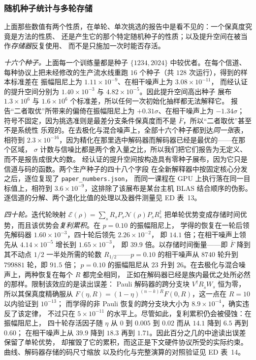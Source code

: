 \documentclass[11pt,a4paper]{article}
\begin{document}
\subsubsection*{随机种子统计与多轮存储}

上面那些数值有两个性质，在单轮、单次挑选的报告中是看不见的：一个保真度究竟是方法的性质、
还是产生它的那个特定随机种子的性质；以及提升空间在被当作\emph{存储器}反复使用、
而不是只施加一次时能否存活。

\emph{十六个种子。}上面每一个训练量都是种子 $\{1234,2024\}$ 中较优者。在每个信道、
每种协议上把未经修改的生产流水线重跑 $16$ 个种子（共 $128$ 次运行），得到的样本标准差在
振幅阻尼上为 $1.11\times10^{-9}$、在相干噪声上为 $3.08\times10^{-11}$，
而经认证的提升空间分别为 $1.40\times10^{-3}$ 与 $4.82\times10^{-5}$。因此提升空间高出种子
展布 $1.3\times10^{6}$ 与 $1.6\times10^{6}$ 个标准差，所以任何一次初始化抽样都无法解释它。
报告“二者取优”所带来的偏倚在振幅阻尼上为 $+0.31\sigma$、在相干噪声上为 $-1.34\sigma$；
符号不固定，因为挑选准则是最差分支条件保真度而不是 $\bar F$，所以“二者取优”甚至不是系统性
乐观的。在去极化与混合噪声上，全部十六个种子都到达\emph{同一张}表，相符到
$2.3\times10^{-16}$，因为精化在那里选中解码器而解码器已经是最优的——在那个区域，
$\sigma$ 计数与信噪比都是两个舍入量之比，所以我们把它们报告为无定义、而不是报告成很大的数。
经认证的提升空间按构造具有零种子展布，因为它只是信道与码的函数。两个生产种子的四十八个字段
在全新解释器中按固定核心分发之后，逐位复现了 \texttt{paper\_numbers.json}，
而同一课程在 GPU 上执行落在同一目标值上，相符到 $3.6\times10^{-9}$，这排除了该展布是某台主机
BLAS 结合顺序的伪影。逐信道的分解、两个退化比值的处理以及器件测量见 ED 表~13。

\emph{四十轮。}迭代轮映射
$\mathcal{E}(\rho)=\sum_s R_sP_s\mathcal{N}(\rho)P_sR_s^\dagger$
把单轮优势变成存储时间优势，而且该优势会\emph{复利累积}。在 $p=0.10$ 的振幅阻尼上，
学得的恢复在一轮后领先解码器 $1.60\times10^{-3}$，四十轮后领先 $2.26\times10^{-2}$，
即 $14.1$ 倍；在相干噪声上领先从 $4.14\times10^{-5}$ 增长到 $1.65\times10^{-3}$，
即 $39.9$ 倍。以存储时间衡量——即 $\bar F$ 降到其不动点 $1/2$ 一半处所需的轮数
$R_{1/2}$——$p=0.10$ 的相干噪声从 $8740$ 轮升到 $799881$ 轮，即 $91.5$ 倍；
$p=0.10$ 的振幅阻尼从 $23$ 升到 $26$。在去极化与混合噪声上，两种恢复在每个 $R$ 都完全相同，
正如在解码器已经是族内最优之处所必然的那样。限制该效应的是读出误差：
Pauli 解码器的跨分支块 $V^\dagger R_{\tilde s}W_s$ 恒为零，所以其保真度精确服从
$F(\eta,R)=(1-\eta)^{(n-k)R}F(0,R)$，这一点在 $R=10$ 以内验证到 $10^{-13}$；
而学得的非 Pauli 恢复的跨分支块大小为 $8.9\times10^{-4}$，确实违反了该定律，
不过只在 $5\times10^{-11}$ 的水平上。尽管如此，复利累积仍会被侵蚀：在振幅阻尼上，
四十轮存活因子随 $\eta$ 从 $0$ 到 $0.005$ 到 $0.02$ 而从 $14.1$ 降到 $6.5$ 再到 $0.60$；
在相干噪声上从 $39.9$ 降到 $18.3$ 再到 $1.71$。因此百分之几的中途读出误差保留了单轮优势，
却摧毁了它的累积，而这正是下文硬件协议所受的实际约束。曲线、解码器存储的码尺寸缩放
以及约化与完整演算的对照验证见 ED 表~14。
\end{document}
